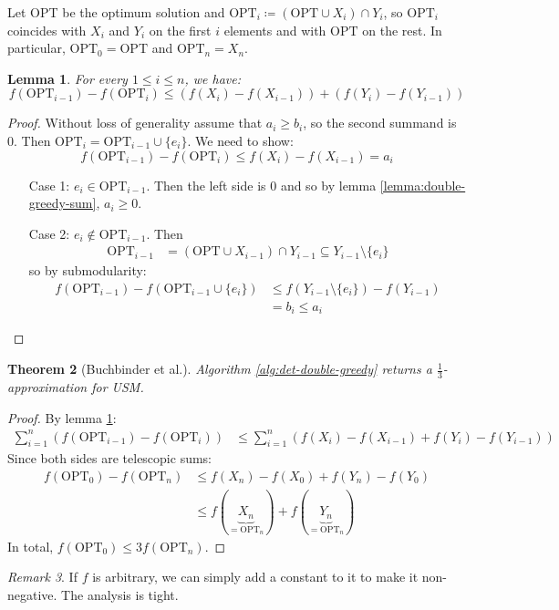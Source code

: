 \documentclass[11pt, a4paper]{article}
\newcommand{\mr}[1]{\mathrm{#1}}
\newcommand{\set}[1]{\{#1\}}
\newtheorem{theorem}{Theorem}[section]
\newtheorem{lemma}[theorem]{Lemma}
\theoremstyle{remark}
\newtheorem{remark}[theorem]{Remark}
\theoremstyle{definition}
\begin{document}
Let OPT be the optimum solution and $\mr{OPT}_i\coloneqq (\mr{OPT}
	\cup X_i)\cap Y_i$, so $\mr{OPT}_i$ coincides with $X_i$ and $Y_i$ on
the first $i$ elements and with $\mr{OPT}$ on the rest. In
particular, $\mr{OPT}_0=\mr{OPT}$ and $\mr{OPT}_n=X_n$.

\begin{lemma}\label{lemma:double-greedy-2}
	For every $1\leq i\leq n$, we have:
	\[f(\mr{OPT}_{i-1})-f(\mr{OPT}_i)\leq (f(X_i)-f(X_{i-1}))+(f(Y_i)-f(Y_{i-1}))\]
\end{lemma}
\begin{proof}
	Without loss of generality assume that $a_i\geq b_i$, so the second summand
	is 0. Then $\mr{OPT}_i=\mr{OPT}_{i-1}\cup\set{e_i}$. We need to show:
	\[f(\mr{OPT}_{i-1})-f(\mr{OPT}_i)\leq f(X_i)-f(X_{i-1})=a_i\]
	\begin{enumerate}
		\item[Case 1:] $e_i\in\mr{OPT}_{i-1}$. Then the left side is 0 and so by
		lemma \ref{lemma:double-greedy-sum}, $a_i\geq0$.

		\item[Case 2:] $e_i\notin\mr{OPT}_{i-1}$. Then
		\begin{align*}
			\mr{OPT}_{i-1} & =(\mr{OPT}\cup X_{i-1})\cap Y_{i-1}\subseteq Y_{i-1}\setminus\set{e_i}
		\end{align*}
		so by submodularity:
		\begin{align*}
			f(\mr{OPT}_{i-1})-f(\mr{OPT}_{i-1}\cup\set{e_i}) & \leq f(Y_{i-1}\setminus \set{e_i})-f(Y_{i-1}) \\
			                                                 & =b_i\leq a_i
		\end{align*}
	\end{enumerate}
\end{proof}

\begin{theorem}[Buchbinder et al.]
	Algorithm \ref{alg:det-double-greedy} returns a $\frac{1}{3}$-approximation
	for USM.
\end{theorem}
\begin{proof}
	By lemma \ref{lemma:double-greedy-2}:
	\begin{align*}
		\sum_{i=1}^n (f(\mr{OPT}_{i-1})-f(\mr{OPT}_i)) & \leq \sum_{i=1}^n (f(X_i)-f(X_{i-1})+f(Y_i)-f(Y_{i-1}))
	\end{align*}
	Since both sides are telescopic sums:
	\begin{align*}
		f(\mr{OPT}_0)-f(\mr{OPT}_n) & \leq f(X_n)-f(X_0)+f(Y_n)-f(Y_0)                                         \\
		                            & \leq f(\underbrace{X_n}_{=\mr{OPT}_n})+f(\underbrace{Y_n}_{=\mr{OPT}_n})
	\end{align*}
	In total, $f(\mr{OPT}_0)\leq 3f(\mr{OPT}_n)$.
\end{proof}
\begin{remark}
	If $f$ is arbitrary, we can simply add a constant to it to make it non-negative.
	The analysis is tight.
\end{remark}
\end{document}
